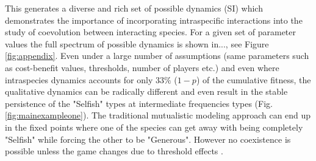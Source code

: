 \documentclass[12pt]{article}
\begin{document}
This generates a diverse and rich set of possible dynamics (SI) which demonstrates the importance of incorporating intraspecific interactions into the study of coevolution between interacting species. For a given set of parameter values the full spectrum of possible dynamics is shown in..., see Figure \ref{fig:appendix}. Even under a large number of assumptions (same parameters such as cost-benefit values, thresholds, number of players etc.) and even where intraspecies dynamics accounts for only $33\%$ ($1-p$) of the cumulative fitness, the qualitative dynamics can be radically different and even result in the stable persistence of the "Selfish" types at intermediate frequencies types (Fig. \ref{fig:mainexampleone}). The traditional mutualistic modeling approach can end up in the fixed points where one of the species can get away with being completely "Selfish" while forcing the other to be "Generous". However no coexistence is possible unless the game changes due to threshold effects \citep{gokhale:PRSB:2012}.
\end{document}
